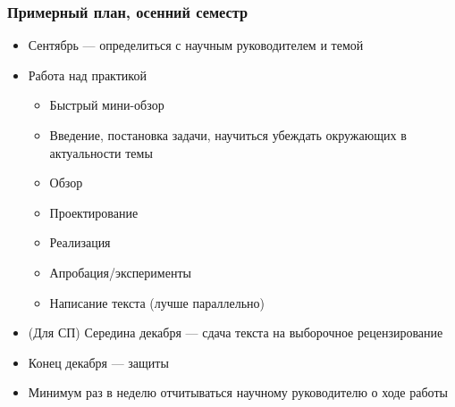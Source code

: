 \documentclass{../../slides-style}
\begin{document}
    \begin{frame}
        \frametitle{Примерный план, осенний семестр}
        \begin{itemize}
            \item Сентябрь --- определиться с научным руководителем и темой
            \item Работа над практикой
            \begin{itemize}
                \item Быстрый мини-обзор
                \item Введение, постановка задачи, научиться убеждать окружающих в актуальности темы
                \item Обзор
                \item Проектирование
                \item Реализация
                \item Апробация/эксперименты
                \item Написание текста (лучше параллельно)
            \end{itemize}
            \item (Для СП) Середина декабря --- сдача текста на выборочное рецензирование
            \item Конец декабря --- защиты
            \item Минимум раз в неделю отчитываться научному руководителю о ходе работы
        \end{itemize}
    \end{frame}
\end{document}
